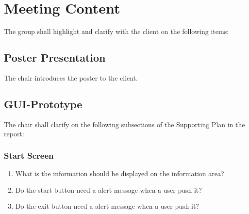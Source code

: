 \documentclass[a4paper] {article}
\begin{document}
	\section{Meeting Content}
	The group shall highlight and clarify with the client on the following items:
	
	\subsection{Poster Presentation}
	The chair introduces the poster to the client.
	
	\subsection{GUI-Prototype}
	The chair shall clarify on the following subsections of the Supporting Plan in the report:

	\subsubsection{Start Screen}
	\begin{enumerate}
	        \item What is the information should be displayed on the information area?
	        \item Do the start button need a alert message when a user push it?
	        \item Do the exit button need a alert message when a user push it?
   \end{enumerate}
   
\end{document}

